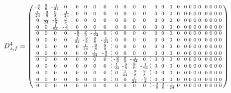 \documentclass[pdftex,a4paper,parskip,listof=totoc,bibliography=totoc,onehalfspacing,12pt]{scrreprt}
\newcommand*\dashline{\hspace{-0.3em}\rotatebox[origin=c]{90}{\scalebox{-0.3}[1]{$-~~-$}}\hspace{-0.3em}}
\begin{document}
\begin{align*}
	D_{x,f}^4 &= \begin{psmallmatrix}
\text{-}\frac{9}{8} & \frac{9}{8} & \text{-}\frac{1}{24} & 0 &\dashline& 0 & 0 & 0 & 0 && 0 & 0 & 0 & 0 && 0 & 0 & 0 & 0 && 0 & 0 & 0 & 0 && 0 & 0 & 0 & 0 \\
\frac{1}{24} & \text{-}\frac{9}{8} & \frac{9}{8} & \text{-}\frac{1}{24} &\dashline& 0 & 0 & 0 & 0 && 0 & 0 & 0 & 0 && 0 & 0 & 0 & 0 && 0 & 0 & 0 & 0 && 0 & 0 & 0 & 0 \\
0 & \frac{1}{24} & \text{-}\frac{9}{8} & \frac{9}{8} &\dashline& 0 & 0 & 0 & 0 && 0 & 0 & 0 & 0 && 0 & 0 & 0 & 0 && 0 & 0 & 0 & 0 && 0 & 0 & 0 & 0 \\
0 & 0 & \frac{1}{24} & \text{-}\frac{9}{8} &\dashline& 0 & 0 & 0 & 0 && 0 & 0 & 0 & 0 && 0 & 0 & 0 & 0 && 0 & 0 & 0 & 0 && 0 & 0 & 0 & 0 \\\hline
0 & 0 & 0 & 0 &\dashline& \text{-}\frac{9}{8} & \frac{9}{8} & \text{-}\frac{1}{24} & 0 &\dashline& 0 & 0 & 0 & 0 && 0 & 0 & 0 & 0 && 0 & 0 & 0 & 0 && 0 & 0 & 0 & 0 \\
0 & 0 & 0 & 0 &\dashline& \frac{1}{24} & \text{-}\frac{9}{8} & \frac{9}{8} & \text{-}\frac{1}{24} &\dashline& 0 & 0 & 0 & 0 && 0 & 0 & 0 & 0 && 0 & 0 & 0 & 0 && 0 & 0 & 0 & 0 \\
0 & 0 & 0 & 0 &\dashline& 0 & \frac{1}{24} & \text{-}\frac{9}{8} & \frac{9}{8} &\dashline& 0 & 0 & 0 & 0 && 0 & 0 & 0 & 0 && 0 & 0 & 0 & 0 && 0 & 0 & 0 & 0 \\
0 & 0 & 0 & 0 &\dashline& 0 & 0 & \frac{1}{24} & \text{-}\frac{9}{8} &\dashline& 0 & 0 & 0 & 0 && 0 & 0 & 0 & 0 && 0 & 0 & 0 & 0 && 0 & 0 & 0 & 0 \\\hline
0 & 0 & 0 & 0 && 0 & 0 & 0 & 0 &\dashline& \text{-}\frac{9}{8} & \frac{9}{8} & \text{-}\frac{1}{24} & 0 &\dashline& 0 & 0 & 0 & 0 && 0 & 0 & 0 & 0 && 0 & 0 & 0 & 0 \\
0 & 0 & 0 & 0 && 0 & 0 & 0 & 0 &\dashline& \frac{1}{24} & \text{-}\frac{9}{8} & \frac{9}{8} & \text{-}\frac{1}{24} &\dashline& 0 & 0 & 0 & 0 && 0 & 0 & 0 & 0 && 0 & 0 & 0 & 0 \\
0 & 0 & 0 & 0 && 0 & 0 & 0 & 0 &\dashline& 0 & \frac{1}{24} & \text{-}\frac{9}{8} & \frac{9}{8} &\dashline& 0 & 0 & 0 & 0 && 0 & 0 & 0 & 0 && 0 & 0 & 0 & 0 \\
0 & 0 & 0 & 0 && 0 & 0 & 0 & 0 &\dashline& 0 & 0 & \frac{1}{24} & \text{-}\frac{9}{8} &\dashline& 0 & 0 & 0 & 0 && 0 & 0 & 0 & 0 && 0 & 0 & 0 & 0 \\\hline
0 & 0 & 0 & 0 && 0 & 0 & 0 & 0 && 0 & 0 & 0 & 0 &\dashline& \text{-}\frac{9}{8} & \frac{9}{8} & \text{-}\frac{1}{24} & 0 &\dashline& 0 & 0 & 0 & 0 && 0 & 0 & 0 & 0 \\

\end{psmallmatrix}
\end{align*}
\end{document}

